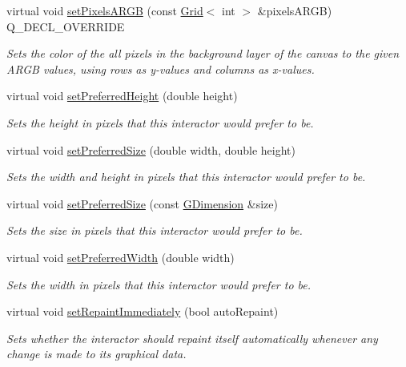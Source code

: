 \begin{DoxyCompactItemize}
virtual void \mbox{\hyperlink{classGCanvas_a64dd4bc93e7f6555e9d96b956602c7c8}{set\+Pixels\+A\+R\+GB}} (const \mbox{\hyperlink{classGrid}{Grid}}$<$ int $>$ \&pixels\+A\+R\+GB) Q\+\_\+\+D\+E\+C\+L\+\_\+\+O\+V\+E\+R\+R\+I\+DE
\begin{DoxyCompactList}\small\item\em Sets the color of the all pixels in the background layer of the canvas to the given A\+R\+GB values, using rows as y-\/values and columns as x-\/values. \end{DoxyCompactList}\item 
virtual void \mbox{\hyperlink{classGInteractor_a1ab987704fce32098706c6f00fb08218}{set\+Preferred\+Height}} (double height)
\begin{DoxyCompactList}\small\item\em Sets the height in pixels that this interactor would prefer to be. \end{DoxyCompactList}\item 
virtual void \mbox{\hyperlink{classGInteractor_a042c5ae19430d765ef552371cae3632c}{set\+Preferred\+Size}} (double width, double height)
\begin{DoxyCompactList}\small\item\em Sets the width and height in pixels that this interactor would prefer to be. \end{DoxyCompactList}\item 
virtual void \mbox{\hyperlink{classGInteractor_aa22d9be4bc0e078bb0ea69b0fc9d7c75}{set\+Preferred\+Size}} (const \mbox{\hyperlink{classGDimension}{G\+Dimension}} \&size)
\begin{DoxyCompactList}\small\item\em Sets the size in pixels that this interactor would prefer to be. \end{DoxyCompactList}\item 
virtual void \mbox{\hyperlink{classGInteractor_a3db429ab2fa52efd187eec0ed8cdd9f2}{set\+Preferred\+Width}} (double width)
\begin{DoxyCompactList}\small\item\em Sets the width in pixels that this interactor would prefer to be. \end{DoxyCompactList}\item 
virtual void \mbox{\hyperlink{classGDrawingSurface_abf5590a3992dcb7896ed449e65961da3}{set\+Repaint\+Immediately}} (bool auto\+Repaint)
\begin{DoxyCompactList}\small\item\em Sets whether the interactor should repaint itself automatically whenever any change is made to its graphical data. \end{DoxyCompactList}\item 

\end{DoxyCompactItemize}
